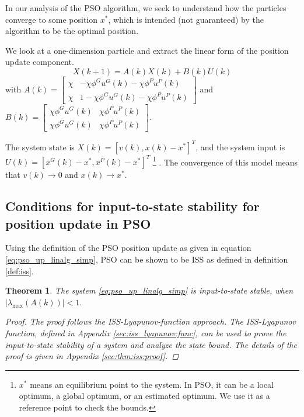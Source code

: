 \documentclass{sig-alternate}
\newtheorem{mythm}{Theorem}
\begin{document}
In our analysis of the PSO algorithm, we seek to understand how the particles converge to some position $ x^{*} $, which is intended (not guaranteed) by the algorithm to be the optimal position.

We look at a one-dimension particle and extract the linear form of the position update component.
\begin{equation}
\label{eq:pso_up_linalg_simp}
X(k+1) = A(k) X(k) + B(k) U(k)
\end{equation}
with
$ A(k) = \begin{bmatrix}
\chi & - \chi \phi^{G} u^{G}(k) - \chi \phi^{P} u^{P}(k)
\\ 
\chi & 1 - \chi \phi^{G} u^{G}(k) - \chi \phi^{P} u^{P}(k)
\end{bmatrix} $
and
$ B(k) = \begin{bmatrix}
\chi \phi^{G} u^{G}(k) & \chi \phi^{P} u^{P}(k)
\\ 
\chi \phi^{G} u^{G}(k) & \chi \phi^{P} u^{P}(k)
\end{bmatrix} $.

The system state is $ X(k) = [ v(k), x(k) - x^{*} ]^{T} $, and the system input is $ U(k) = [ x^{G}(k) - x^{*} , x^{P}(k) - x^{*} ]^{T} $
\footnote{$ x^{*} $ means an equilibrium point to the system.
In PSO, it can be a local optimum, a global optimum, or an estimated optimum.
We use it as a reference point to check the bounds.}
.
The convergence of this model means that $ v(k) \rightarrow 0 $ and $ x(k) \rightarrow x^{*} $.

\subsection{Conditions for input-to-state stability for position update in PSO}

Using the definition of the PSO position update as given in equation \eqref{eq:pso_up_linalg_simp}, PSO can be shown to be ISS as defined in definition \ref{def:iss}.

\begin{mythm}
\label{thm:iss}
The system \eqref{eq:pso_up_linalg_simp} is input-to-state stable, when $ | \lambda_{\max} ( A(k) ) | < 1 $.
\begin{proof}
The proof follows the ISS-Lyapunov-function approach. 
The ISS-Lyapunov function, defined in Appendix \ref{sec:iss_lyapunov:func}, can be used to prove the input-to-state stability of a system and analyze the state bound\cite{Jiang2001857}.
The details of the proof is given in Appendix \ref{sec:thm:iss:proof}.
\end{proof}
\end{mythm}
\end{document}
